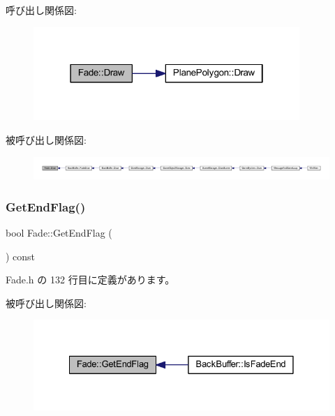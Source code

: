 呼び出し関係図\+:\nopagebreak
\begin{figure}[H]
\begin{center}
\leavevmode
\includegraphics[width=286pt]{class_fade_a84a9e688650ac500e03cde74ff0210b8_cgraph}
\end{center}
\end{figure}
被呼び出し関係図\+:
\nopagebreak
\begin{figure}[H]
\begin{center}
\leavevmode
\includegraphics[width=350pt]{class_fade_a84a9e688650ac500e03cde74ff0210b8_icgraph}
\end{center}
\end{figure}
\mbox{\label{class_fade_acc8adf28ce2e4270e5fb3907d83dadd0}} 
\subsubsection{\texorpdfstring{Get\+End\+Flag()}{GetEndFlag()}}
{\footnotesize\ttfamily bool Fade\+::\+Get\+End\+Flag (\begin{DoxyParamCaption}{ }\end{DoxyParamCaption}) const\hspace{0.3cm}{\ttfamily [inline]}}



 Fade.\+h の 132 行目に定義があります。

被呼び出し関係図\+:\nopagebreak
\begin{figure}[H]
\begin{center}
\leavevmode
\includegraphics[width=328pt]{class_fade_acc8adf28ce2e4270e5fb3907d83dadd0_icgraph}
\end{center}
\end{figure}
\mbox{\label{class_fade_a6aed6912ebf9c243c52cb82f298d8d64}} 
